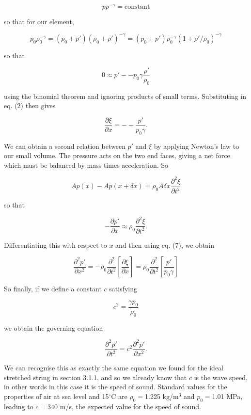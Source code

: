   $$p \rho^{-\gamma} = \mathrm{constant} \tag{4}$$ 

  so that for our element, 

  $$p_0 \rho_0^{-\gamma} = (p_0 +p') (\rho_0 + \rho')^{-\gamma} = (p_0 +p') 
  \rho_0 ^{-\gamma} (1+ \rho'/\rho_0)^{-\gamma} \tag{5}$$ 

  so that 

  $$0 \approx p' -- p_0 \gamma \frac{\rho'}{\rho_0} \tag{6}$$ 

  using the binomial theorem and ignoring products of small terms. Substituting 
  in eq. (2) then gives 

  $$\frac{\partial \xi}{\partial x} = -- \frac{p'}{p_0 \gamma} . \tag{7}$$ 

  We can obtain a second relation between $p'$ and $\xi$ by applying Newton's 
  law to our small volume. The pressure acts on the two end faces, giving a net 
  force which must be balanced by mass times acceleration. So 

  $$A p(x) -A p(x+ \delta x) = \rho_0 A \delta x \frac{\partial^2 \xi}{\partial 
  t^2} \tag{8}$$ 

  so that 

  $$- \frac{\partial p'}{\partial x} \approx \rho_0 \frac{\partial^2 
  \xi}{\partial t^2} . \tag{9}$$ 

  Differentiating this with respect to $x$ and then using eq. (7), we obtain 

  $$\frac{\partial^2 p'}{\partial x^2} = -\rho_0 \frac{\partial^2}{\partial 
  t^2} \left[ \frac{\partial \xi}{\partial x} \right]= \rho_0 
  \frac{\partial^2}{\partial t^2} \left[ \frac{p'}{p_0 \gamma} \right] 
  \tag{10}$$ 

  So finally, if we define a constant $c$ satisfying 

  $$c^2 =\frac{\gamma p_0}{\rho_0} \tag{11}$$ 

  we obtain the governing equation 

  $$\frac{\partial^2 p'}{\partial t^2}= c^2 \frac{\partial^2 p'}{\partial x^2} 
  .\tag{12}$$ 

  We can recognise this as exactly the same equation we found for the ideal 
  stretched string in section 3.1.1, and so we already know that $c$ is the 
  wave speed, in other words in this case it is the speed of sound. Standard 
  values for the properties of air at sea level and 15$^\circ$C are 
  $\rho_0=$1.225 kg/m$^3$ and $p_0=$1.01 MPa, leading to $c=340$ m/s, the 
  expected value for the speed of sound. 

